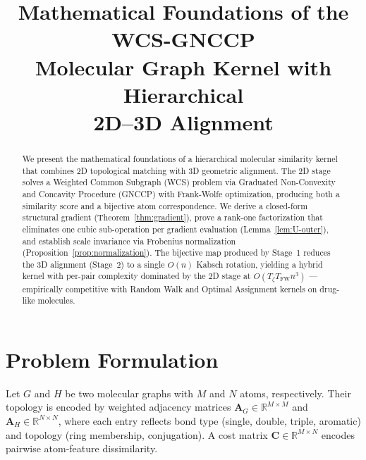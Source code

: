 \documentclass[conference]{IEEEtran}
\begin{document}
\title{Mathematical Foundations of the WCS-GNCCP\\Molecular Graph Kernel with Hierarchical\\2D--3D Alignment}

\author{%
}

\maketitle

\begin{abstract}
We present the mathematical foundations of a hierarchical molecular
similarity kernel that combines 2D topological matching with 3D
geometric alignment.  The 2D stage solves a Weighted Common Subgraph
(WCS) problem via Graduated Non-Convexity and Concavity Procedure
(GNCCP) with Frank-Wolfe optimization, producing both a similarity
score and a bijective atom correspondence.  We derive a closed-form
structural gradient (Theorem~\ref{thm:gradient}), prove a rank-one
factorization that eliminates one cubic sub-operation per gradient
evaluation (Lemma~\ref{lem:U-outer}), and establish scale invariance
via Frobenius normalization (Proposition~\ref{prop:normalization}).
The bijective map produced by Stage~1 reduces the 3D alignment
(Stage~2) to a single $O(n)$ Kabsch rotation, yielding a hybrid kernel
with per-pair complexity dominated by the 2D stage at
$O(T_\zeta T_{\mathrm{FW}} n^3)$ --- empirically competitive with
Random Walk and Optimal Assignment kernels on drug-like molecules.
\end{abstract}


\section{Problem Formulation}
\label{sec:formulation}

Let $G$ and $H$ be two molecular graphs with $M$ and $N$ atoms, respectively.
Their topology is encoded by weighted adjacency matrices
$\mathbf{A}_G \!\in\! \mathbb{R}^{M \times M}$ and
$\mathbf{A}_H \!\in\! \mathbb{R}^{N \times N}$,
where each entry reflects bond type (single, double, triple, aromatic)
and topology (ring membership, conjugation).
A cost matrix $\mathbf{C} \!\in\! \mathbb{R}^{M \times N}$ encodes pairwise
atom-feature dissimilarity.
\end{document}
